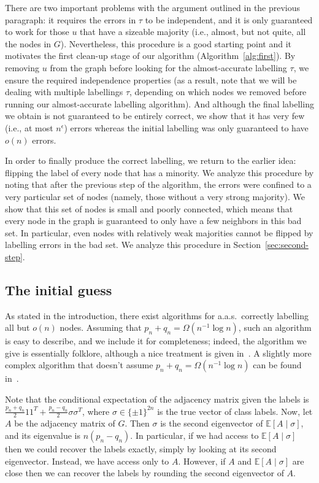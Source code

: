 \documentclass[EJP,final]{ejpecp}
\newcommand{\E}{\mathbb{E}}
\newcommand{\1}[1]{\mathbbm{1}_{\{#1\}}}
\begin{document}
There are two important problems with the argument outlined in the
previous paragraph: it requires the errors in $\tau$
to be independent, and it is only guaranteed to work
for those $u$ that have a sizeable majority (i.e., almost, but not quite,
all the nodes in $G$). Nevertheless, this procedure is a good starting
point and it motivates the first clean-up stage of our
algorithm (Algorithm~\ref{alg:first}). By removing
$u$ from the graph before looking for the almost-accurate labelling $\tau$,
we ensure the required independence properties
(as a result, note that we will be dealing with multiple labellings $\tau$,
depending on which nodes we removed before running our almost-accurate labelling
algorithm). And although the final
labelling we obtain is not guaranteed to be entirely correct, we show
that it has very few (i.e., at most $n^\epsilon$) errors whereas
the initial labelling was only guaranteed to have $o(n)$ errors.

In order to finally produce the correct labelling, we
return to the earlier idea: flipping the label of every node
that has a minority. We analyze this procedure by noting that
after the previous step of the algorithm, the errors were confined to
a very particular set of nodes (namely, those without a very strong majority).
We show that this set of nodes is small and poorly connected, which
means that every node in the graph is guaranteed to only have a few neighbors
in this bad set. In particular, even nodes with relatively weak majorities
cannot be flipped by labelling errors in the bad set.
We analyze this procedure in Section~\ref{sec:second-step}.


\subsection{The initial guess}\label{sec:spectral}

As stated in the introduction,
there exist algorithms for a.a.s.\ correctly labelling all but
$o(n)$ nodes. Assuming that $p_n + q_n = \Omega(n^{-1} \log n)$, such
an algorithm is easy to describe, and we include it for completeness;
indeed, the algorithm we give is essentially
folklore, although a nice treatment is given in~\cite{NadakuditiNewman:12}.
A slightly more complex algorithm that doesn't assume
$p_n + q_n = \Omega(n^{-1} \log n)$ can be found in~\cite{YunProutiere:14}.

Note that the conditional expectation
of the adjacency matrix given the labels is $\frac{p_n + q_n}{2} 1 1^T + \frac{p_n - q_n}{2} \sigma \sigma^T$,
where $\sigma \in \{\pm 1\}^{2n}$ is the true vector of class labels.
Now, let $A$ be the adjacency matrix of $G$. Then $\sigma$ is the second eigenvector of $\E [A \mid \sigma]$,
and its eigenvalue is $n(p_n - q_n)$. In particular, if we had access to $\E [A \mid \sigma]$ then
we could recover the labels exactly, simply by looking at its second eigenvector.
Instead, we have access only to $A$. However, if $A$ and $\E[A \mid \sigma]$ are close then
we can recover the labels by rounding the second eigenvector of $A$.
\end{document}
